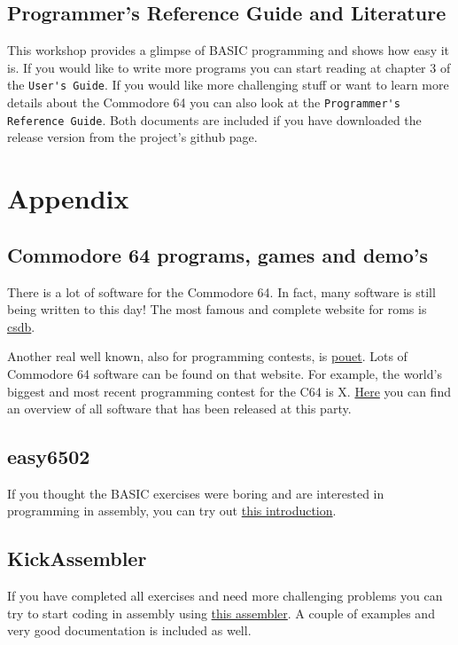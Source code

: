 \documentclass{article}
\newcounter{problem}
\begin{document}
\subsection{Programmer's Reference Guide and Literature}

This workshop provides a glimpse of BASIC programming and shows how easy it is.
If you would like to write more programs you can start reading at chapter 3 of the \verb:User's Guide:.
If you would like more challenging stuff or want to learn more details about the Commodore 64 you can also look at the \verb:Programmer's Reference Guide:.
Both documents are included if you have downloaded the release version from the project's github page.

\section{Appendix}

\subsection{Commodore 64 programs, games and demo's}

There is a lot of software for the Commodore 64.
In fact, many software is still being written to this day!
The most famous and complete website for roms is \href{http://csdb.dk}{csdb}.

Another real well known, also for programming contests, is \href{https://www.pouet.net}{pouet}.
Lots of Commodore 64 software can be found on that website.
For example, the world's biggest and most recent programming contest for the C64 is X.
\href{https://www.pouet.net/party.php?which=50&when=2016}{Here} you can find an overview of all software that has been released at this party.

\subsection{easy6502}

If you thought the BASIC exercises were boring and are interested in programming in assembly, you can try out \href{https://skilldrick.github.io/easy6502/}{this introduction}.

\subsection{KickAssembler}

If you have completed all exercises and need more challenging problems you can try to start coding in assembly using \href{http://theweb.dk/KickAssembler/Main.html#frontpage}{this assembler}.
A couple of examples and very good documentation is included as well.
\end{document}
